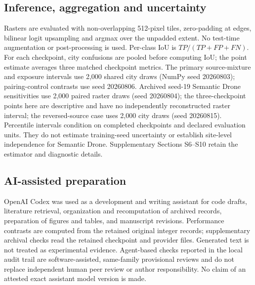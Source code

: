 \subsection{Inference, aggregation and uncertainty}
\label{sec:contrasts}
Rasters are evaluated with non-overlapping 512-pixel tiles, zero-padding at edges, bilinear logit upsampling and argmax over the unpadded extent. No test-time augmentation or post-processing is used. Per-class IoU is \(TP/(TP+FP+FN)\). For each checkpoint, city confusions are pooled before computing IoU; the point estimate averages three matched checkpoint metrics. The primary source-mixture and exposure intervals use 2,000 shared city draws (NumPy seed 20260803); pairing-control contrasts use seed 20260806. Archived seed-19 Semantic Drone sensitivities use 2,000 paired raster draws (seed 20260804); the three-checkpoint points here are descriptive and have no independently reconstructed raster interval; the reversed-source case uses 2,000 city draws (seed 20260815). Percentile intervals condition on completed checkpoints and declared evaluation units. They do not estimate training-seed uncertainty or establish site-level independence for Semantic Drone. Supplementary Sections S6--S10 retain the estimator and diagnostic details.


\subsection{AI-assisted preparation}
\label{sec:ai_assistance}
OpenAI Codex was used as a development and writing assistant for code drafts, literature retrieval, organization and recomputation of archived records, preparation of figures and tables, and manuscript revisions. Performance contrasts are computed from the retained original integer records; supplementary archival checks read the retained checkpoint and provider files. Generated text is not treated as experimental evidence. Agent-based checks reported in the local audit trail are software-assisted, same-family provisional reviews and do not replace independent human peer review or author responsibility. No claim of an attested exact assistant model version is made.

